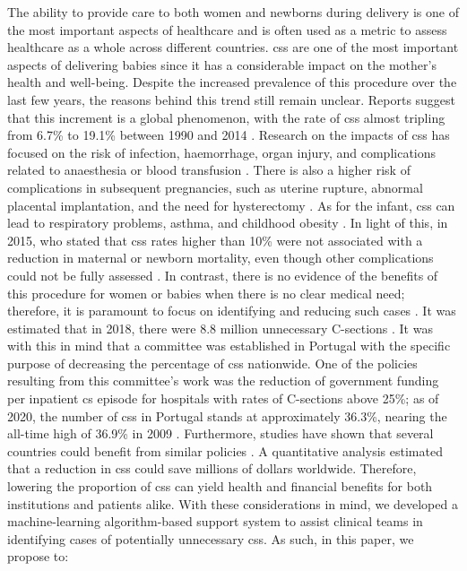 
The ability to provide care to both women and newborns during delivery is one of the most important aspects of healthcare and is often used as a metric to assess healthcare as a whole across different countries. \acp{cs} are one of the most important aspects of delivering babies since it has a considerable impact on the mother's health and well-being. Despite the increased prevalence of this procedure over the last few years, the reasons behind this trend still remain unclear. Reports suggest that this increment is a global phenomenon, with the rate of \acp{cs} almost tripling from 6.7\% to 19.1\% between 1990 and 2014 \cite{betranIncreasingTrendCaesarean2016,chenNonClinicalInterventions2018}. Research on the impacts of \acp{cs} has focused on the risk of infection, haemorrhage, organ injury, and complications related to anaesthesia or blood transfusion \cite{caesereanrisk1,caesereanrisk2}.
There is also a higher risk of complications in subsequent pregnancies, such as uterine rupture, abnormal placental implantation, and the need for hysterectomy \cite{caesereanrisk3,caesereanrisk4}. As for the infant, \acp{cs} can lead to respiratory problems, asthma, and childhood obesity \cite{caesereanrisk3}.
In light of this, in 2015, \ac{who} stated that \acp{cs} rates higher than 10\% were not associated with a reduction in maternal or newborn mortality, even though other complications could not be fully assessed \cite{worldhealthorganizationhumanreproductionprogramme10april2015WHOStatementCaesarean2015}. In contrast, there is no evidence of the benefits of this procedure for women or babies when there is no clear medical need; therefore, it is paramount to focus on identifying and reducing such cases \cite{chenNonClinicalInterventions2018}.  It was estimated that in 2018, there were 8.8 million unnecessary C-sections \cite{hoxhaCaesareanSectionsHealth2021}.
It was with this in mind that a committee was established in Portugal with the specific purpose of decreasing the percentage of \acp{cs} nationwide. One of the policies resulting from this committee's work was the reduction of government funding per inpatient \ac{cs} episode for hospitals with rates of C-sections above 25\%; as of 2020, the number of \acp{cs} in Portugal stands at approximately 36.3\%, nearing the all-time high of 36.9\% in 2009 \cite{pordatacesarianas}. Furthermore, studies have shown that several countries could benefit from similar policies \cite{hoxhaCaesareanSectionsHealth2021}.
A quantitative analysis estimated that a reduction in \acp{cs} could save millions of dollars \cite{callanderFinancingMaternityEarly2020} worldwide. Therefore, lowering the proportion of \acp{cs} can yield health and financial benefits for both institutions and patients alike. With these considerations in mind, we developed a machine-learning algorithm-based support system to assist clinical teams in identifying cases of potentially unnecessary \acp{cs}. As such, in this paper, we propose to:


